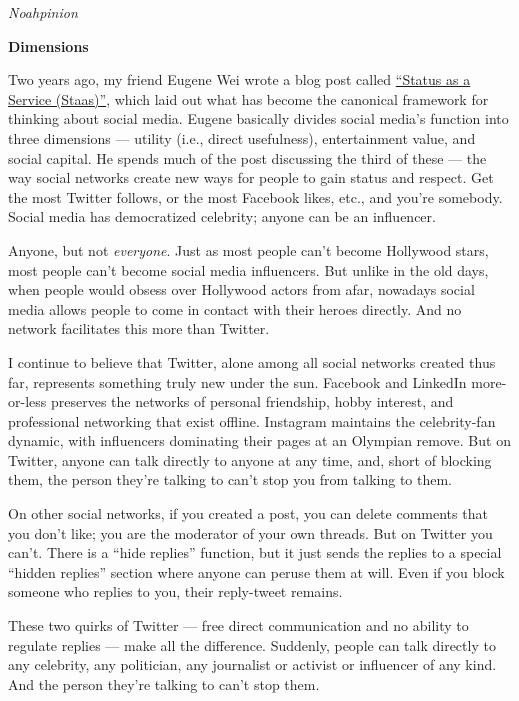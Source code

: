 \documentclass[
]{book}
\begin{document}
\emph{Noahpinion}

\textbf{Dimensions}

Two years ago, my friend Eugene Wei wrote a blog post called \href{https://www.eugenewei.com/blog/2019/2/19/status-as-a-service}{``Status as a Service (Staas)''}, which laid out what has become the canonical framework for thinking about social media. Eugene basically divides social media's function into three dimensions --- utility (i.e., direct usefulness), entertainment value, and social capital. He spends much of the post discussing the third of these --- the way social networks create new ways for people to gain status and respect. Get the most Twitter follows, or the most Facebook likes, etc., and you're somebody. Social media has democratized celebrity; anyone can be an influencer.

Anyone, but not \emph{everyone}. Just as most people can't become Hollywood stars, most people can't become social media influencers. But unlike in the old days, when people would obsess over Hollywood actors from afar, nowadays social media allows people to come in contact with their heroes directly. And no network facilitates this more than Twitter.

I continue to believe that Twitter, alone among all social networks created thus far, represents something truly new under the sun. Facebook and LinkedIn more-or-less preserves the networks of personal friendship, hobby interest, and professional networking that exist offline. Instagram maintains the celebrity-fan dynamic, with influencers dominating their pages at an Olympian remove. But on Twitter, anyone can talk directly to anyone at any time, and, short of blocking them, the person they're talking to can't stop you from talking to them.

On other social networks, if you created a post, you can delete comments that you don't like; you are the moderator of your own threads. But on Twitter you can't. There is a ``hide replies'' function, but it just sends the replies to a special ``hidden replies'' section where anyone can peruse them at will. Even if you block someone who replies to you, their reply-tweet remains.

These two quirks of Twitter --- free direct communication and no ability to regulate replies --- make all the difference. Suddenly, people can talk directly to any celebrity, any politician, any journalist or activist or influencer of any kind. And the person they're talking to can't stop them.
\end{document}
